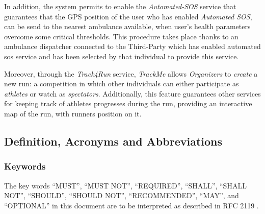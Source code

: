 \documentclass[a4paper]{article}
\begin{document}
    In addition, the system permits to enable the \textit{Automated-SOS} service that guarantees that the GPS position of the user who has enabled \textit{Automated SOS}, can be send to the nearest ambulance available, when user's health parameters overcome some critical thresholds. This procedure takes place thanks to an ambulance dispatcher connected to the Third-Party which has enabled automated sos service and has been selected by that individual to provide this service.
   
    Moreover, through  the \textit{Track4Run} service, \textit{TrackMe} allows \textit{Organizers}  to  \textit{create}  a  new  run: a  competition  in  which other individuals can either participate as \textit{athletes} or watch as \textit{spectators}.  Additionally, this feature guarantees other services for keeping track of athletes progresses during the run, providing an interactive map of the run, with runners position on it.
    
\subsection{Definition, Acronyms and  Abbreviations}
            \subsubsection{Keywords}
            The key words “MUST”, “MUST NOT”, “REQUIRED”, “SHALL”, “SHALL NOT”, “SHOULD”, “SHOULD NOT”, “RECOMMENDED”, “MAY”, and “OPTIONAL” in this document are to be interpreted as described in RFC 2119 \cite{bradner1997key}.
            
\end{document}

